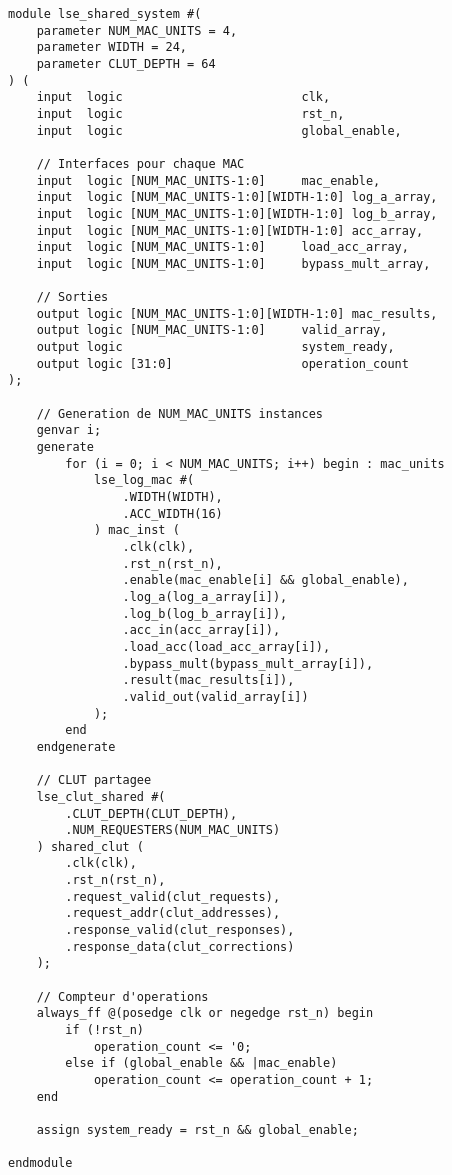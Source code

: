 \documentclass[12pt,a4paper]{article}
\begin{document}
\begin{lstlisting}[style=verilog, caption={Module lse\_shared\_system.sv (extrait)}]
module lse_shared_system #(
    parameter NUM_MAC_UNITS = 4,
    parameter WIDTH = 24,
    parameter CLUT_DEPTH = 64
) (
    input  logic                         clk,
    input  logic                         rst_n,
    input  logic                         global_enable,
    
    // Interfaces pour chaque MAC
    input  logic [NUM_MAC_UNITS-1:0]     mac_enable,
    input  logic [NUM_MAC_UNITS-1:0][WIDTH-1:0] log_a_array,
    input  logic [NUM_MAC_UNITS-1:0][WIDTH-1:0] log_b_array,
    input  logic [NUM_MAC_UNITS-1:0][WIDTH-1:0] acc_array,
    input  logic [NUM_MAC_UNITS-1:0]     load_acc_array,
    input  logic [NUM_MAC_UNITS-1:0]     bypass_mult_array,
    
    // Sorties
    output logic [NUM_MAC_UNITS-1:0][WIDTH-1:0] mac_results,
    output logic [NUM_MAC_UNITS-1:0]     valid_array,
    output logic                         system_ready,
    output logic [31:0]                  operation_count
);

    // Generation de NUM_MAC_UNITS instances
    genvar i;
    generate
        for (i = 0; i < NUM_MAC_UNITS; i++) begin : mac_units
            lse_log_mac #(
                .WIDTH(WIDTH),
                .ACC_WIDTH(16)
            ) mac_inst (
                .clk(clk),
                .rst_n(rst_n),
                .enable(mac_enable[i] && global_enable),
                .log_a(log_a_array[i]),
                .log_b(log_b_array[i]),
                .acc_in(acc_array[i]),
                .load_acc(load_acc_array[i]),
                .bypass_mult(bypass_mult_array[i]),
                .result(mac_results[i]),
                .valid_out(valid_array[i])
            );
        end
    endgenerate
    
    // CLUT partagee
    lse_clut_shared #(
        .CLUT_DEPTH(CLUT_DEPTH),
        .NUM_REQUESTERS(NUM_MAC_UNITS)
    ) shared_clut (
        .clk(clk),
        .rst_n(rst_n),
        .request_valid(clut_requests),
        .request_addr(clut_addresses),
        .response_valid(clut_responses),
        .response_data(clut_corrections)
    );
    
    // Compteur d'operations
    always_ff @(posedge clk or negedge rst_n) begin
        if (!rst_n)
            operation_count <= '0;
        else if (global_enable && |mac_enable)
            operation_count <= operation_count + 1;
    end
    
    assign system_ready = rst_n && global_enable;
    
endmodule
\end{lstlisting}
\end{document}
